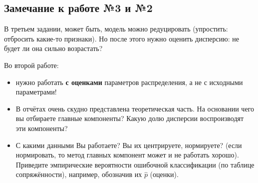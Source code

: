 \documentclass[main.tex]{subfiles}
\begin{document}
\subsection{Замечание к работе №3 и №2}

В третьем задании, может быть, модель можно редуцировать (упростить: отбросить какие-то признаки).
Но после этого нужно оценить дисперсию: не будет ли она сильно возрастать?

Во второй работе:
\begin{itemize}[noitemsep]
    \item нужно работать \textbf{с оценками} параметров распределения, а не с исходными параметрами!
    \item В отчётах очень скудно представлена теоретическая часть.
    На основании чего вы отбираете главные компоненты?
    Какую долю дисперсии воспроизводят эти компоненты?
    \item С какими данными Вы работаете? Вы их центрируете, нормируете? (если нормировать, то метод главных компонент может и не работать хорошо).
    Приведите эмпирические вероятности ошибочной классификации (по таблице сопряжённости), например, обозначив их $ \hat p $ (оценки).
\end{itemize}
\end{document}
